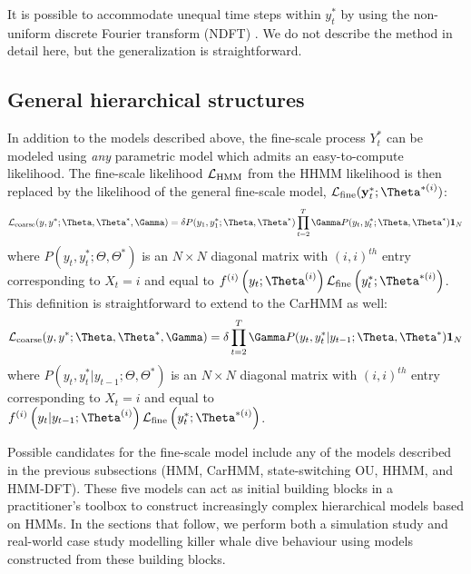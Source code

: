 It is possible to accommodate unequal time steps within $y_t^*$ by using the non-uniform discrete Fourier transform (NDFT) \citep{Bagchi:1999}. We do not describe the method in detail here, but the generalization is straightforward.

\subsection{General hierarchical structures}

In addition to the models described above, the fine-scale process $Y^*_t$ can be modeled using \textit{any} parametric model which admits an easy-to-compute likelihood. The fine-scale likelihood $\mathcal{L}_{\text{HMM}}$ from the HHMM likelihood is then replaced by the likelihood of the general fine-scale model, $\calL_{\text{fine}}(\mathbf{y}^*_t;\Theta^{*(i)})$:
\[
\calL_{\text{coarse}}(y,y^*;\Theta,\Theta^*,\Gamma) = \delta P(y_1,y^*_1;\Theta,\Theta^*) \prod_{t=2}^T \Gamma P(y_t,y^*_t;\Theta,\Theta^*) \mathbf{1}_N
\]
where $P(y_t,y^*_t;\Theta,\Theta^*) $ is an $N \times N$ diagonal matrix with $(i,i)^{th}$ entry corresponding to $X_t=i$ and equal to $f^{(i)}\left(y_t;\Theta^{(i)}\right)\calL_{\text{fine}}\left(y^*_t;\Theta^{*(i)}\right)$. This definition is straightforward to extend to the CarHMM as well:
\[
\calL_{\text{coarse}}(y,y^*;\Theta,\Theta^*,\Gamma) = \delta \prod_{t=2}^T \Gamma P(y_t,y^*_t|y_{t-1};\Theta,\Theta^*) \mathbf{1}_N
\]
where $P(y_t,y^*_t|y_{t-1};\Theta,\Theta^*) $ is an $N \times N$ diagonal matrix with $(i,i)^{th}$ entry corresponding to $X_t=i$ and equal to $f^{(i)}\left(y_t|y_{t-1};\Theta^{(i)}\right)\calL_{\text{fine}}\left(y^*_t;\Theta^{*(i)}\right)$.

Possible candidates for the fine-scale model include any of the models described in the previous subsections (HMM, CarHMM, state-switching OU, HHMM, and HMM-DFT). These five models can act as initial building blocks in a practitioner's toolbox to construct increasingly complex hierarchical models based on HMMs. In the sections that follow, we perform both a simulation study and real-world case study modelling killer whale dive behaviour using models constructed from these building blocks.